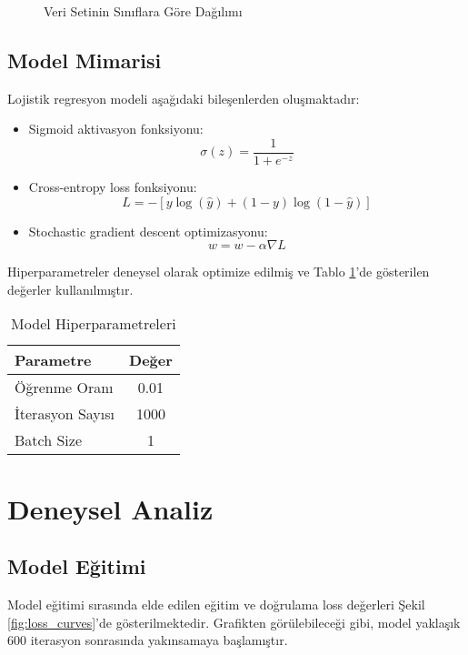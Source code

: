 \documentclass[conference]{IEEEtran}
\begin{document}
\begin{figure}[!t]
\centering
\caption{Veri Setinin Sınıflara Göre Dağılımı}
\label{fig:data_distribution}
\end{figure}

\subsection{Model Mimarisi}
Lojistik regresyon modeli aşağıdaki bileşenlerden oluşmaktadır:
\begin{itemize}
\item Sigmoid aktivasyon fonksiyonu: 
\begin{equation}
\sigma(z) = \frac{1}{1 + e^{-z}}
\end{equation}
\item Cross-entropy loss fonksiyonu:
\begin{equation}
L = -[y\log(\hat{y}) + (1-y)\log(1-\hat{y})]
\end{equation}
\item Stochastic gradient descent optimizasyonu:
\begin{equation}
w = w - \alpha\nabla L
\end{equation}
\end{itemize}

Hiperparametreler deneysel olarak optimize edilmiş ve Tablo
\ref{tab:hyperparameters}'de gösterilen değerler kullanılmıştır.

\begin{table}[!t]
\caption{Model Hiperparametreleri}
\label{tab:hyperparameters}
\centering
\begin{tabular}{|l|c|}
\hline
\textbf{Parametre} & \textbf{Değer} \\
\hline
Öğrenme Oranı & 0.01 \\
İterasyon Sayısı & 1000 \\
Batch Size & 1 \\
\hline
\end{tabular}
\end{table}

\section{Deneysel Analiz}

\subsection{Model Eğitimi}
Model eğitimi sırasında elde edilen eğitim ve doğrulama loss değerleri Şekil
\ref{fig:loss_curves}'de gösterilmektedir. Grafikten görülebileceği gibi, model
yaklaşık 600 iterasyon sonrasında yakınsamaya başlamıştır.
\end{document}
